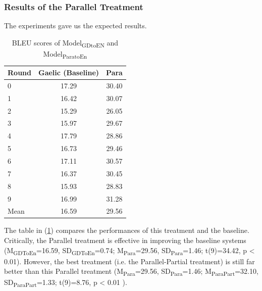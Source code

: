 \documentclass[final]{ua-thesis}
\numberwithin{equation}{section}
\begin{document}
\subsubsection{Results of the Parallel Treatment}\label{treatment:Para_result}
The experiments gave us the expected results. 
\begin{table}[ht]
\centering
\begin{tabular}{lcc}
  \hline
Round & Gaelic (Baseline) & Para \\ 
  \hline
0 & 17.29 & 30.40 \\ 
  1 & 16.42 & 30.07 \\ 
  2 & 15.29 & 26.05 \\ 
  3 & 15.97 & 29.67 \\ 
  4 & 17.79 & 28.86 \\ 
  5 & 16.73 & 29.46 \\ 
  6 & 17.11 & 30.57 \\ 
  7 & 16.37 & 30.45 \\ 
  8 & 15.93 & 28.83 \\ 
  9 & 16.99 & 31.28 \\ 
   \hline
Mean & 16.59 & 29.56 \\ 
   \hline
\end{tabular}
\caption{BLEU scores of Model\textsubscript{GDtoEN} and Model\textsubscript{ParatoEn}} 
\label{Table:Para}
\end{table}The table in (\ref{Table:Para}) compares the performances of this treatment and the baseline. Critically, the Parallel treatment is effective in improving the baseline systems (M\textsubscript{GDToEn}=16.59, SD\textsubscript{GDToEn}=0.74; M\textsubscript{Para}=29.56, SD\textsubscript{Para}=1.46; t(9)=34.42, p < 0.01). 
However, the best treatment (i.e. the Parallel-Partial treatment) is still far better than this Parallel treatment 
(M\textsubscript{Para}=29.56, SD\textsubscript{Para}=1.46; M\textsubscript{ParaPart}=32.10, SD\textsubscript{ParaPart}=1.33; t(9)=8.76, p < 0.01 ).
\end{document}
